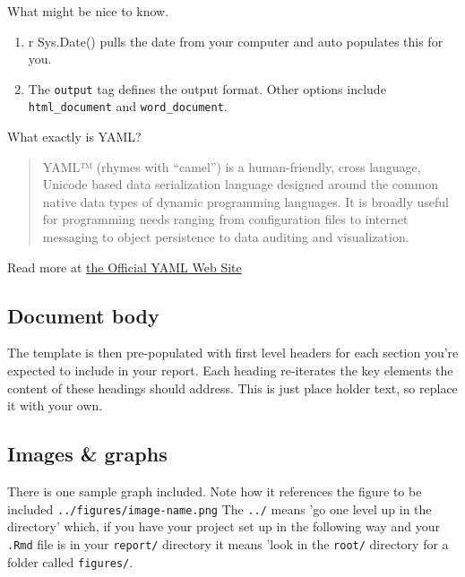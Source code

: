 \documentclass[
]{book}
\providecommand{\tightlist}{%
  \setlength{\itemsep}{0pt}\setlength{\parskip}{0pt}}
\begin{document}
What might be nice to know.

\begin{enumerate}
\def\labelenumi{\arabic{enumi}.}
\tightlist
\item
  r Sys.Date() pulls the date from your computer and auto populates this for you.
\item
  The \texttt{output} tag defines the output format. Other options include \texttt{html\_document} and \texttt{word\_document}.
\end{enumerate}

What exactly is YAML?

\begin{quote}
YAML™ (rhymes with ``camel'') is a human-friendly, cross language, Unicode based data serialization language designed around the common native data types of dynamic programming languages. It is broadly useful for programming needs ranging from configuration files to internet messaging to object persistence to data auditing and visualization.
\end{quote}

Read more at \href{https://yaml.org/}{the Official YAML Web Site}

\hypertarget{document-body}{%
\subsection*{Document body}\label{document-body}}

The template is then pre-populated with first level headers for each section you're expected to include in your report. Each heading re-iterates the key elements the content of these headings should address. This is just place holder text, so replace it with your own.

\hypertarget{images-graphs}{%
\subsection*{Images \& graphs}\label{images-graphs}}

There is one sample graph included. Note how it references the figure to be included \texttt{../figures/image-name.png} The \texttt{../} means 'go one level up in the directory' which, if you have your project set up in the following way and your \texttt{.Rmd} file is in your \texttt{report/} directory it means 'look in the \texttt{root/} directory for a folder called \texttt{figures/}.
\end{document}
